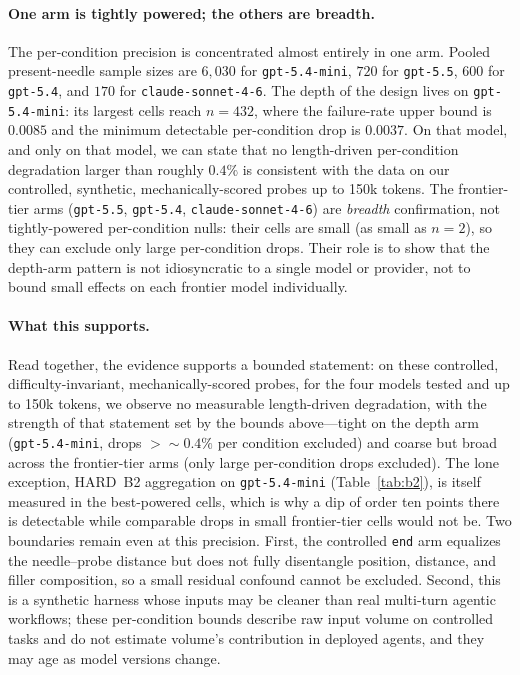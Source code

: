 \paragraph{One arm is tightly powered; the others are breadth.} The
per-condition precision is concentrated almost entirely in one arm. Pooled
present-needle sample sizes are $6{,}030$ for \texttt{gpt-5.4-mini}, $720$ for
\texttt{gpt-5.5}, $600$ for \texttt{gpt-5.4}, and $170$ for
\texttt{claude-sonnet-4-6}. The depth of the design lives on
\texttt{gpt-5.4-mini}: its largest cells reach $n=432$, where the failure-rate
upper bound is $0.0085$ and the minimum detectable per-condition drop is
$0.0037$. On that model, and only on that model, we can state that no
length-driven per-condition degradation larger than roughly $0.4\%$ is
consistent with the data on our controlled, synthetic, mechanically-scored
probes up to 150k tokens. The frontier-tier arms (\texttt{gpt-5.5},
\texttt{gpt-5.4}, \texttt{claude-sonnet-4-6}) are \emph{breadth} confirmation,
not tightly-powered per-condition nulls: their cells are small (as small as
$n=2$), so they can exclude only large per-condition drops. Their role is to
show that the depth-arm pattern is not idiosyncratic to a single model or
provider, not to bound small effects on each frontier model individually.

\paragraph{What this supports.} Read together, the evidence supports a bounded
statement: on these controlled, difficulty-invariant, mechanically-scored
probes, for the four models tested and up to 150k tokens, we observe no
measurable length-driven degradation, with the strength of that statement set
by the bounds above---tight on the depth arm (\texttt{gpt-5.4-mini}, drops
$>\!\sim\!0.4\%$ per condition excluded) and coarse but broad across the
frontier-tier arms (only large per-condition drops excluded). The lone
exception, HARD~B2 aggregation on \texttt{gpt-5.4-mini}
(Table~\ref{tab:b2}), is itself measured in the best-powered cells, which is
why a dip of order ten points there is detectable while comparable drops in
small frontier-tier cells would not be. Two boundaries remain even at this
precision. First, the controlled \texttt{end} arm equalizes the needle--probe
distance but does not fully disentangle position, distance, and filler
composition, so a small residual confound cannot be excluded. Second, this is
a synthetic harness whose inputs may be cleaner than real multi-turn agentic
workflows; these per-condition bounds describe raw input volume on controlled
tasks and do not estimate volume's contribution in deployed agents, and they
may age as model versions change.
